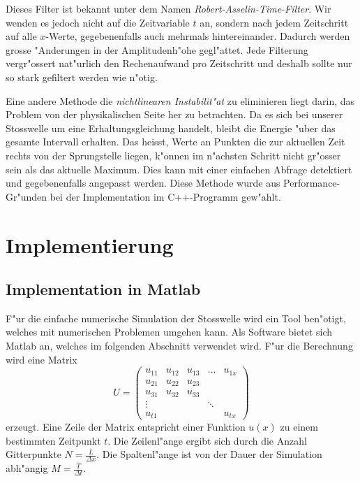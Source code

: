 \begin{refsection}
Dieses Filter ist bekannt unter dem Namen
\textit{Robert-Asselin-Time-Filter}\cite{stoss:filter}. Wir wenden es
jedoch nicht auf die Zeitvariable $t$ an, sondern nach jedem Zeitschritt
auf alle $x$-Werte, gegebenenfalls auch mehrmals hintereinander. Dadurch
werden grosse "Anderungen in der Amplitudenh"ohe gegl"attet. Jede
Filterung vergr"ossert nat"urlich den Rechenaufwand pro Zeitschritt und
deshalb sollte nur so stark gefiltert werden wie n"otig. 


Eine andere Methode die \textit{nichtlinearen Instabilit"at} zu
eliminieren liegt darin, das Problem von der physikalischen Seite her zu
betrachten. Da es sich bei unserer Stosswelle um eine Erhaltungsgleichung
handelt, bleibt die Energie "uber das gesamte Intervall erhalten. Das
heisst, Werte an Punkten die zur aktuellen Zeit rechts von der
Sprungstelle liegen, k"onnen im n"achsten Schritt nicht gr"osser
sein als das aktuelle Maximum. Dies kann mit einer einfachen Abfrage
detektiert und gegebenenfalls angepasst werden. Diese Methode wurde aus
Performance-Gr"unden bei der Implementation im C++-Programm gew"ahlt.



\section{Implementierung}
\label{stosswellen:implementation}
\subsection{Implementation in Matlab}
F"ur die einfache numerische Simulation der Stosswelle wird ein Tool
ben"otigt, welches mit numerischen Problemen umgehen kann. Als Software
bietet sich Matlab an, welches im folgenden Abschnitt verwendet wird.
F"ur die Berechnung wird eine Matrix 
\begin{equation}
U=
\begin{pmatrix}
	u_{11}	& u_{12}& u_{13}& \dots	&u_{1x}	\\
	u_{21}	& u_{22}& u_{23}& 	& 	\\
	u_{31}	& u_{32}& u_{33}&  	& 	\\
	\vdots 	&  	& 	& \ddots&  	\\
	u_{t1} 	&  	&  	&   	& u_{tx}
\end{pmatrix}
\end{equation}
erzeugt. Eine Zeile der Matrix entspricht einer Funktion $u(x)$ zu einem
bestimmten Zeitpunkt $t$. Die Zeilenl"ange ergibt sich durch die Anzahl
Gitterpunkte $N = \frac{L}{\Delta x}$. Die Spaltenl"ange ist von der
Dauer der Simulation abh"angig $M = \frac{T}{\Delta t}$. 


\end{refsection}
